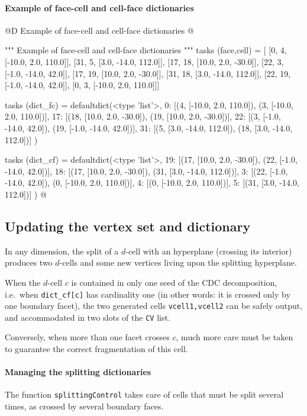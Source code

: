 \documentclass[11pt,oneside]{article}	%
\begin{document}
\paragraph{Example of face-cell and cell-face dictionaries}

@D Example of face-cell and cell-face dictionaries
@{""" Example of face-cell and cell-face dictionaries """
tasks (face,cell) = [
 [0, 4, [-10.0, 2.0, 110.0]],
 [31, 5, [3.0, -14.0, 112.0]],
 [17, 18, [10.0, 2.0, -30.0]],
 [22, 3, [-1.0, -14.0, 42.0]],
 [17, 19, [10.0, 2.0, -30.0]],
 [31, 18, [3.0, -14.0, 112.0]],
 [22, 19, [-1.0, -14.0, 42.0]],
 [0, 3, [-10.0, 2.0, 110.0]]]

tasks (dict_fc) = defaultdict(<type 'list'>, {
  0: [(4, [-10.0, 2.0, 110.0]), (3, [-10.0, 2.0, 110.0])],
 17: [(18, [10.0, 2.0, -30.0]), (19, [10.0, 2.0, -30.0])],
 22: [(3, [-1.0, -14.0, 42.0]), (19, [-1.0, -14.0, 42.0])],
 31: [(5, [3.0, -14.0, 112.0]), (18, [3.0, -14.0, 112.0])]  })

tasks (dict_cf) = defaultdict(<type 'list'>, {
 19: [(17, [10.0, 2.0, -30.0]), (22, [-1.0, -14.0, 42.0])],
 18: [(17, [10.0, 2.0, -30.0]), (31, [3.0, -14.0, 112.0])],
  3: [(22, [-1.0, -14.0, 42.0]), (0, [-10.0, 2.0, 110.0])],
  4: [(0, [-10.0, 2.0, 110.0])],
  5: [(31, [3.0, -14.0, 112.0])]  })
@}


\subsection{Updating the vertex set and dictionary}

In any dimension, the split of a $d$-cell with an hyperplane (crossing its interior) produces two $d$-cells and some new vertices living upon the splitting hyperplane.

When the $d$-cell $c$ is contained in only one seed of the CDC decomposition, i.e.~when \texttt{dict\_cf[c]} has cardinality one (in other words: it is crossed only by one boundary facet), the two generated cells \texttt{vcell1,vcell2} can be safely output, and accommodated in two slots of the \texttt{CV} list.

Conversely, when more than one facet crosses $c$, much more care must be taken to guarantee the correct fragmentation of this cell.


\paragraph{Managing the splitting dictionaries}
The function \texttt{splittingControl} takes care of cells that must be split several times, as crossed by several boundary faces. 
\end{document}
